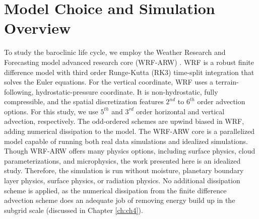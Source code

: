 \section{Model Choice and Simulation Overview}
\label{sec:simulationOverview}
To study the baroclinic life cycle, we employ the Weather Research and Forecasting model advanced research core (WRF-ARW) \cite{Skamarock2008}. WRF is a robust finite difference model with third order Runge-Kutta (RK3) time-split integration that solves the Euler equations. For the vertical coordinate, WRF uses a terrain-following, hydrostatic-pressure coordinate. It is non-hydrostatic, fully compressible, and the spatial discretization features $2^{nd}$ to $6^{th}$ order advection options. For this study, we use $5^{th}$ and $3^{rd}$ order horizontal and vertical advection, respectively. The odd-ordered schemes are upwind biased in WRF, adding numerical dissipation to the model. The WRF-ARW core is a parallelized model capable of running both real data simulations and idealized simulations. \\

Though WRF-ARW offers many physics options, including surface physics, cloud parameterizations, and microphysics, the work presented here is an idealized study. Therefore, the simulation is run without moisture, planetary boundary layer physics, surface physics, or radiation physics. No additional dissipation scheme is applied, as the numerical dissipation from the finite difference advection scheme does an adequate job of removing energy build up in the subgrid scale (discussed in Chapter \ref{ch:ch4}).\\

